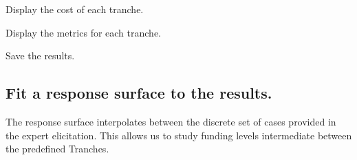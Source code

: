 \documentclass[letterpaper,10pt,english]{sphinxmanual}
\begin{document}
\begin{sphinxVerbatim}[commandchars=\\\{\}]
   
\end{sphinxVerbatim}

\sphinxAtStartPar
Display the cost of each tranche.

\begin{sphinxVerbatim}[commandchars=\\\{\}]
\end{sphinxVerbatim}



\sphinxAtStartPar
Display the metrics for each tranche.

\begin{sphinxVerbatim}[commandchars=\\\{\}]
\end{sphinxVerbatim}



\sphinxAtStartPar
Save the results.

\begin{sphinxVerbatim}[commandchars=\\\{\}]
\end{sphinxVerbatim}


\subsection{Fit a response surface to the results.}
\label{\detokenize{example-analysis:fit-a-response-surface-to-the-results}}
\sphinxAtStartPar
The response surface interpolates between the discrete set of cases
provided in the expert elicitation. This allows us to study funding
levels intermediate between the pre\sphinxhyphen{}defined Tranches.
\end{document}
